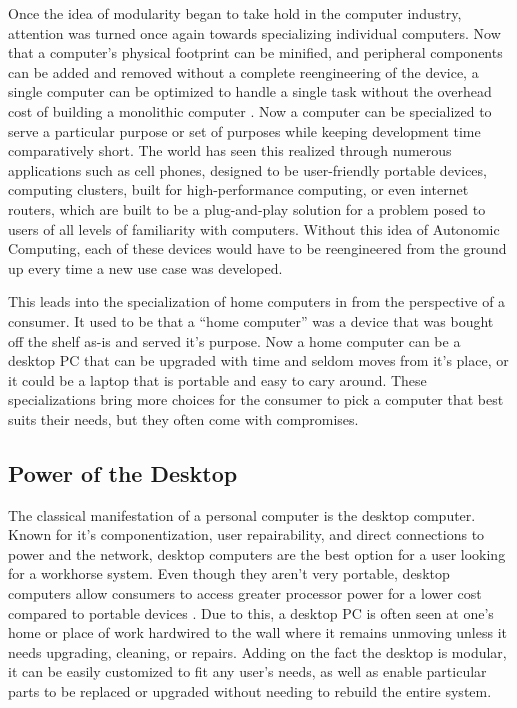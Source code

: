 Once the idea of modularity began to take hold in the computer industry, attention was turned once again towards specializing individual computers.
Now that a computer's physical footprint can be minified, and peripheral components can be added and removed without a complete reengineering of the device, a single computer can be optimized to handle a single task without the overhead cost of building a monolithic computer \citep{Burbeck2007ComplexityAT}.
Now a computer can be specialized to serve a particular purpose or set of purposes while keeping development time comparatively short.
The world has seen this realized through numerous applications such as cell phones, designed to be user-friendly portable devices, computing clusters, built for high-performance computing, or even internet routers, which are built to be a plug-and-play solution for a problem posed to users of all levels of familiarity with computers.
Without this idea of Autonomic Computing, each of these devices would have to be reengineered from the ground up every time a new use case was developed.

This leads into the specialization of home computers in from the perspective of a consumer.
It used to be that a \enquote{home computer} was a device that was bought off the shelf as-is and served it's purpose.
Now a home computer can be a desktop PC that can be upgraded with time and seldom moves from it's place, or it could be a laptop that is portable and easy to cary around.
These specializations bring more choices for the consumer to pick a computer that best suits their needs, but they often come with compromises.

\subsection{Power of the Desktop}

The classical manifestation of a personal computer is the desktop computer.
Known for it's componentization, user repairability, and direct connections to power and the network, desktop computers are the best option for a user looking for a workhorse system.
Even though they aren't very portable, desktop computers allow consumers to access greater processor power for a lower cost compared to portable devices \citep{Meyer20145RS}.
Due to this, a desktop PC is often seen at one's home or place of work hardwired to the wall where it remains unmoving unless it needs upgrading, cleaning, or repairs.
Adding on the fact the desktop is modular, it can be easily customized to fit any user's needs, as well as enable particular parts to be replaced or upgraded without needing to rebuild the entire system.

